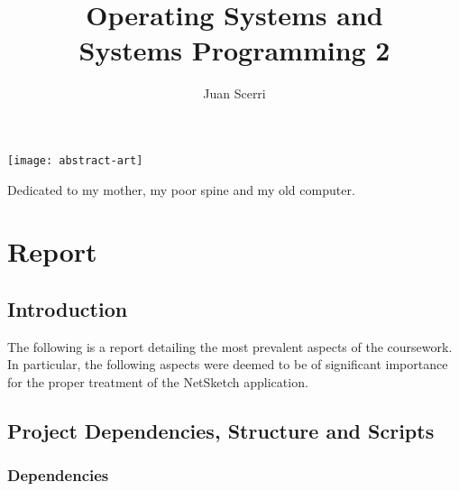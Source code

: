 \documentclass[article]{uom-coursework}
\title{Operating Systems and \\ Systems Programming 2}
\author{Juan Scerri}
\makeatletter
\newcommand{\RemoveAlgoNumber}{\renewcommand{\fnum@algocf}{\AlCapSty{\AlCapFnt\algorithmcfname}}}
\makeatother
\begin{document}
\RemoveAlgoNumber


\pagestyle{umpage}

\frontmatter

\maketitle %

\clearpage

\thispagestyle{empty}
\vspace*{9em}
\begin{center}
\texttt{[image: abstract-art]}
\end{center}

\vspace*{2em}
\begin{center}
    Dedicated to my mother, my poor spine and my old computer.
\end{center}

\clearpage

\tableofcontents %

\clearpage

\mainmatter

\chapter*{Report}
\label{chap:report}

\section{Introduction}

The following is a report detailing the most prevalent aspects
of the coursework. In particular, the following aspects were
deemed to be of significant importance for the proper treatment
of the NetSketch application.

\section{Project Dependencies, Structure and Scripts}

\subsection{Dependencies}
\end{document}
